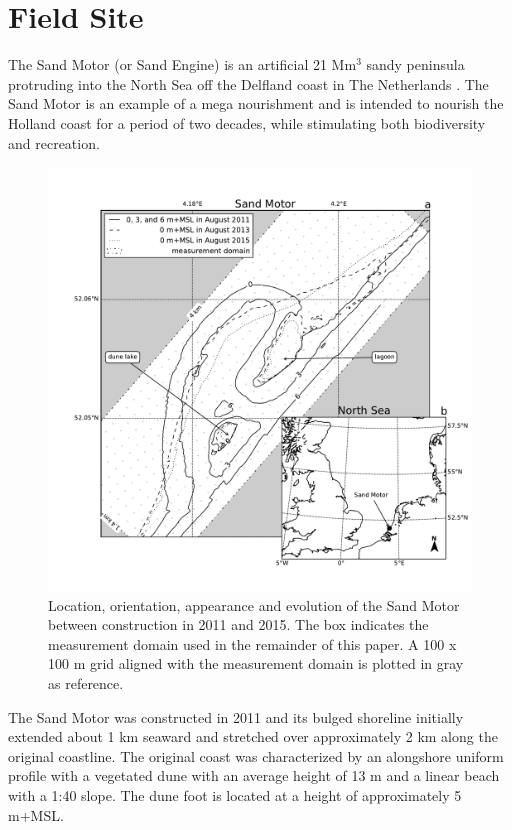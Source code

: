 \section{Field Site}
\label{sec:fieldsite}

The Sand Motor (or Sand Engine) is an artificial 21 $\mathrm{Mm^3}$
sandy peninsula protruding into the North Sea off the Delfland coast
in The Netherlands \citep[Figure \ref{fig:fieldsite},][]{Stive2013}.
The Sand Motor is an example of a mega nourishment and is intended to
nourish the Holland coast for a period of two decades, while
stimulating both biodiversity and recreation.

\begin{figure}
  \centering
  \includegraphics[width=\columnwidth]{../Figures/location_and_evolution}
  \caption{Location, orientation, appearance and evolution of the Sand
    Motor between construction in 2011 and 2015. The box indicates the
    measurement domain used in the remainder of this paper. A 100 x
    100 m grid aligned with the measurement domain is plotted in gray
    as reference.}
  \label{fig:fieldsite}
\end{figure}

The Sand Motor was constructed in 2011 and its bulged shoreline
initially extended about 1 km seaward and stretched over approximately
2 km along the original coastline. The original coast was
characterized by an alongshore uniform profile with a vegetated dune
with an average height of 13 m and a linear beach with a 1:40
slope. The dune foot is located at a height of approximately 5 m+MSL.

